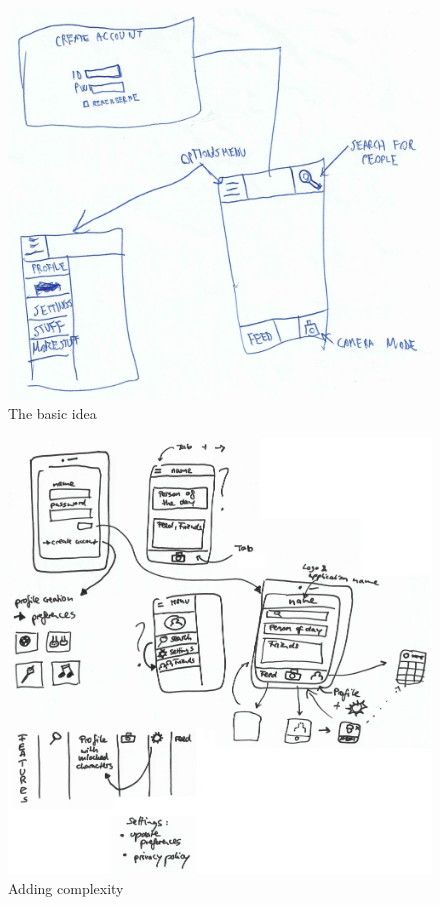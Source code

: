 \documentclass[12pt]{scrartcl}
\begin{document}
	\begin{figure}[H]
        		\centering
       		\includegraphics[width=\textwidth]{../images/design2.jpg}
       		\caption{The basic idea}
        		\label{sketch2}
	\end{figure}
	
	\begin{figure}[H]
        		\centering
       		\includegraphics[width=\textwidth]{../images/design3.jpg}
       		\caption{Adding complexity}
        		\label{sketch3}
	\end{figure}
	
\end{document}
